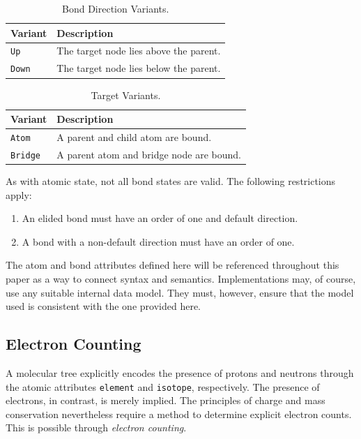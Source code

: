 \documentclass{article}
\def\ttt{\texttt}
\begin{document}
\begin{table}
    \caption{Bond Direction Variants.}
    \centering
    \begin{tabular}{l p{6.6cm}}
        \hline
        Variant & Description \\
        \hline
        \ttt{Up} & The target node lies above the parent. \\
        \tt{Down} & The target node lies below the parent. \\
        \hline
    \end{tabular}
    \label{table:bond-direction-variants}
    \end{table}

\begin{table}
\caption{Target Variants.}
\centering
\begin{tabular}{l p{6.6cm}}
    \hline
    Variant & Description \\
    \hline
    \ttt{Atom} & A parent and child atom are bound. \\
    \tt{Bridge} & A parent atom and bridge node are bound. \\
    \hline
\end{tabular}
\label{table:target-variants}
\end{table}

As with atomic state, not all bond states are valid. The following restrictions apply:

\begin{enumerate}
    \item{An elided bond must have an order of one and default direction.}
    \item{A bond with a non-default direction must have an order of one.}
\end{enumerate}

The atom and bond attributes defined here will be referenced throughout this paper as a way to connect syntax and semantics. Implementations may, of course, use any suitable internal data model. They must, however, ensure that the model used is consistent with the one provided here.

\subsection*{Electron Counting}
\label{electron-counting}

A molecular tree explicitly encodes the presence of protons and neutrons through the atomic attributes \ttt{element} and \ttt{isotope}, respectively. The presence of electrons, in contrast, is merely implied. The principles of charge and mass conservation nevertheless require a method to determine explicit electron counts. This is possible through \textit{electron counting}. 
\end{document}
